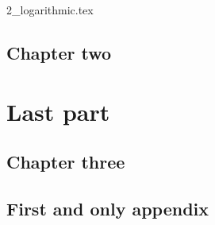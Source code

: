 \documentclass{book}
\begin{document}
{2_logarithmic.tex}


\chapter{Chapter two}


\part{Last part}
\chapter{Chapter three}

\appendix
\chapter{First and only appendix}

\backmatter
\end{document}

